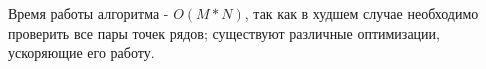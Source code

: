 

Время работы алгоритма - $O(M*N)$, так как в худшем случае необходимо проверить все пары точек рядов; существуют различные оптимизации, ускоряющие его работу.